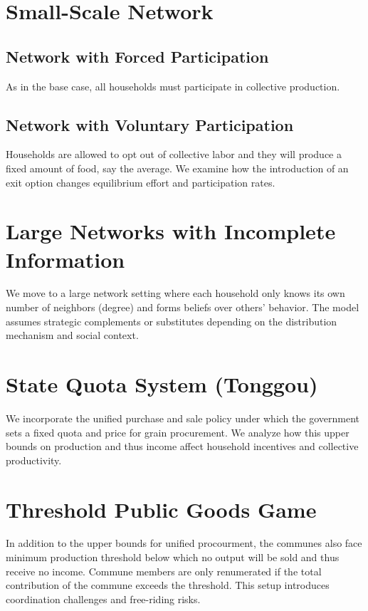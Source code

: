 \documentclass[12pt]{article}
\begin{document}
\section{Small-Scale Network}
\subsection{Network with Forced Participation}
As in the base case, all households must participate in collective production.

\subsection{Network with Voluntary Participation}
Households are allowed to opt out of collective labor and they will produce a fixed amount of food, say the average. We examine how the introduction of an exit option changes equilibrium effort and participation rates.

\section{Large Networks with Incomplete Information}
We move to a large network setting where each household only knows its own number of neighbors (degree) and forms beliefs over others' behavior. The model assumes strategic complements or substitutes depending on the distribution mechanism and social context.

\section{State Quota System (Tonggou)}
We incorporate the unified purchase and sale policy under which the government sets a fixed quota and price for grain procurement. We analyze how this upper bounds on production and thus income affect household incentives and collective productivity.

\section{Threshold Public Goods Game}
In addition to the upper bounds for unified procourment, the communes also face minimum production threshold below which no output will be sold and thus receive no income. Commune members are only renumerated if the total contribution of the commune exceeds the threshold. This setup introduces coordination challenges and free-riding risks.
\end{document}
